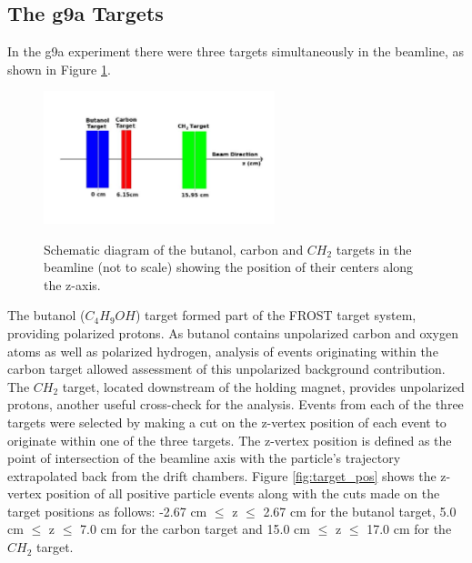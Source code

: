 \subsection{The g9a Targets}
In the g9a experiment there were three targets simultaneously in the beamline, as shown in Figure \ref{fig:target_draw}.
\begin{figure}[htb]
  \begin{center}
    \includegraphics[width=0.6\textwidth]{figures/targets_drawing.png} \\
    \caption{Schematic diagram of the butanol, carbon and $CH_2$ targets in the beamline (not to scale) showing the position of their centers along the z-axis. }
    \label{fig:target_draw}
    \end{center}
  \end{figure}
The butanol ($C_4 H_9OH$) target formed part of the FROST target system,  providing polarized protons. As butanol contains unpolarized carbon and oxygen atoms as well as polarized hydrogen, analysis of events originating within the carbon target allowed assessment of this unpolarized background contribution. The $CH_2$ target, located downstream of the holding magnet, provides unpolarized protons, another useful cross-check for the analysis. Events from each of the three targets were selected by making a cut on the z-vertex position of each event to originate within one of the three targets. The z-vertex position is defined as the point of intersection of the beamline axis with the particle’s trajectory extrapolated back from the drift chambers. Figure \ref{fig:target_pos} shows the z-vertex position of all positive particle events along with the cuts made on the target positions as follows: -2.67 cm $\leq$ z $\leq$ 2.67 cm for the butanol target, 5.0 cm $\leq$ z $\leq$ 7.0 cm for the carbon target and 15.0 cm $\leq$ z $\leq$ 17.0 cm for the $CH_2$ target.
